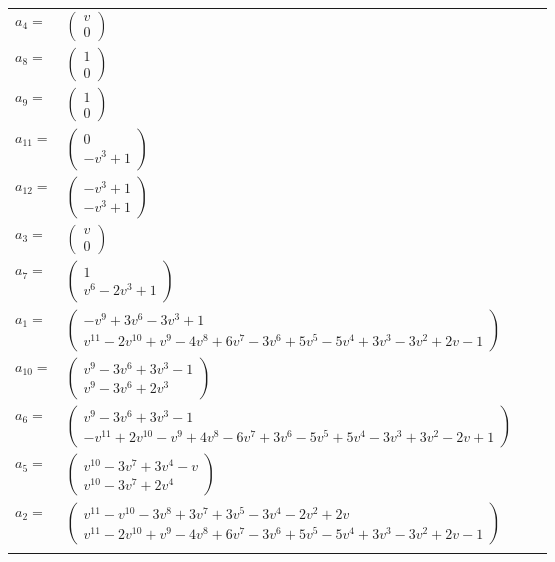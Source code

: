 \documentclass[1p]{elsarticle_modified}
\theoremstyle{definition}
\begin{document}
\begin{tabular}{m{7pt} m{180pt} m{7pt} m{180pt} }
\flushright $a_{4}=$&$\begin{pmatrix}v\\0\end{pmatrix}$ \\
\flushright $a_{8}=$&$\begin{pmatrix}1\\0\end{pmatrix}$ \\
\flushright $a_{9}=$&$\begin{pmatrix}1\\0\end{pmatrix}$ \\
\flushright $a_{11}=$&$\begin{pmatrix}0\\- v^3+1\end{pmatrix}$ \\
\flushright $a_{12}=$&$\begin{pmatrix}- v^3+1\\- v^3+1\end{pmatrix}$ \\
\flushright $a_{3}=$&$\begin{pmatrix}v\\0\end{pmatrix}$ \\
\flushright $a_{7}=$&$\begin{pmatrix}1\\v^6-2 v^3+1\end{pmatrix}$ \\
\flushright $a_{1}=$&$\begin{pmatrix}- v^9+3 v^6-3 v^3+1\\v^{11}-2 v^{10}+v^9-4 v^8+6 v^7-3 v^6+5 v^5-5 v^4+3 v^3-3 v^2+2 v-1\end{pmatrix}$ \\
\flushright $a_{10}=$&$\begin{pmatrix}v^9-3 v^6+3 v^3-1\\v^9-3 v^6+2 v^3\end{pmatrix}$ \\
\flushright $a_{6}=$&$\begin{pmatrix}v^9-3 v^6+3 v^3-1\\- v^{11}+2 v^{10}- v^9+4 v^8-6 v^7+3 v^6-5 v^5+5 v^4-3 v^3+3 v^2-2 v+1\end{pmatrix}$ \\
\flushright $a_{5}=$&$\begin{pmatrix}v^{10}-3 v^7+3 v^4- v\\v^{10}-3 v^7+2 v^4\end{pmatrix}$ \\
\flushright $a_{2}=$&$\begin{pmatrix}v^{11}- v^{10}-3 v^8+3 v^7+3 v^5-3 v^4-2 v^2+2 v\\v^{11}-2 v^{10}+v^9-4 v^8+6 v^7-3 v^6+5 v^5-5 v^4+3 v^3-3 v^2+2 v-1\end{pmatrix}$\\&\end{tabular}
\end{document}
